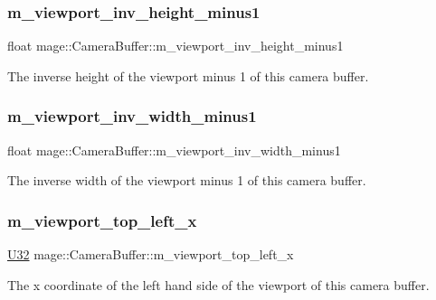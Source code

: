 \subsubsection{\texorpdfstring{m\+\_\+viewport\+\_\+inv\+\_\+height\+\_\+minus1}{m\_viewport\_inv\_height\_minus1}}
{\footnotesize\ttfamily float mage\+::\+Camera\+Buffer\+::m\+\_\+viewport\+\_\+inv\+\_\+height\+\_\+minus1}

The inverse height of the viewport minus 1 of this camera buffer. \hypertarget{structmage_1_1_camera_buffer_a732177939aabe34b07d2120275fb246a}{}\label{structmage_1_1_camera_buffer_a732177939aabe34b07d2120275fb246a} 
\subsubsection{\texorpdfstring{m\+\_\+viewport\+\_\+inv\+\_\+width\+\_\+minus1}{m\_viewport\_inv\_width\_minus1}}
{\footnotesize\ttfamily float mage\+::\+Camera\+Buffer\+::m\+\_\+viewport\+\_\+inv\+\_\+width\+\_\+minus1}

The inverse width of the viewport minus 1 of this camera buffer. \hypertarget{structmage_1_1_camera_buffer_aa1a4a218d604beb0777e9286daad8c8b}{}\label{structmage_1_1_camera_buffer_aa1a4a218d604beb0777e9286daad8c8b} 
\subsubsection{\texorpdfstring{m\+\_\+viewport\+\_\+top\+\_\+left\+\_\+x}{m\_viewport\_top\_left\_x}}
{\footnotesize\ttfamily \hyperlink{namespacemage_a41c104c036fba3756a74e19f793eeaa1}{U32} mage\+::\+Camera\+Buffer\+::m\+\_\+viewport\+\_\+top\+\_\+left\+\_\+x}

The x coordinate of the left hand side of the viewport of this camera buffer. \hypertarget{structmage_1_1_camera_buffer_af3200b46348fecc86ecca3717767ae6b}{}\label{structmage_1_1_camera_buffer_af3200b46348fecc86ecca3717767ae6b} 
